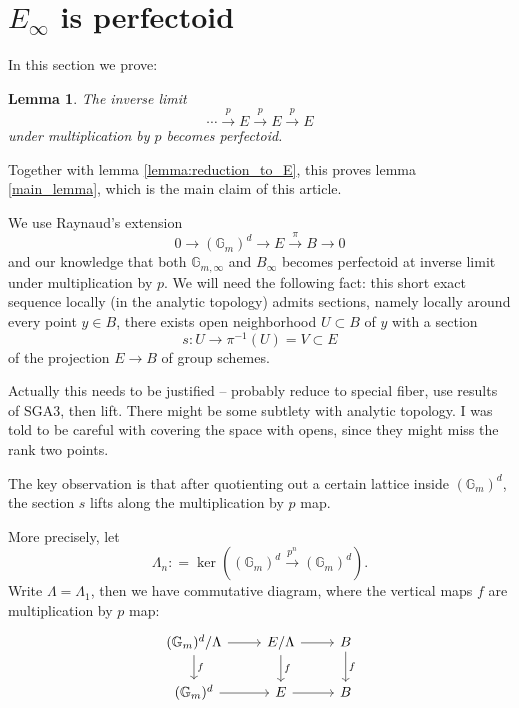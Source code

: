 \documentclass[11pt,oneside]{amsart}
\theoremstyle{theorem}
\newtheorem{lemma}[theorem]{Lemma}
\theoremstyle{definition}
\theoremstyle{remark}
\begin{document}
\section{$E_\infty$ is perfectoid}

In this section we prove: 

\begin{lemma} \label{lemma:E_is_perfectoid}
The inverse limit
$$ \cdots  \xrightarrow{p} E   \xrightarrow{p} E   \xrightarrow{p} E  $$
under multiplication by $p$ becomes perfectoid.  
\end{lemma}

Together with lemma \ref{lemma:reduction_to_E}, this proves lemma \ref{main_lemma}, which is the main claim of this article. 

We use Raynaud's extension 
$$ 0 \rightarrow (\mathbb G_m)^d \rightarrow E \xrightarrow{\pi} B \rightarrow 0 $$ and our knowledge that both $\mathbb G_{m, \infty}$ and $B_\infty$ becomes perfectoid at inverse limit under multiplication by $p$. We will need the following fact: this short exact sequence locally (in the analytic topology) admits sections, namely locally around every point $y \in B$, there exists open neighborhood  $U \subset B$ of $y$ with a section
$$s: U \rightarrow \pi^{-1} (U) = V \subset E$$ of the projection $E \rightarrow B$ of group schemes. 

{\color{red} Actually this needs to be justified -- probably reduce to special fiber, use results of SGA3, then lift. There might be some subtlety with analytic topology. I was told to be careful with covering the space with opens, since they might miss the rank two points. }

The key observation is that after quotienting out a certain lattice inside $(\mathbb G_m)^d$, the section $s$ lifts along the multiplication by $p$ map. 

More precisely, let 
$$\Lambda_n : = \ker ((\mathbb G_m)^d \xrightarrow{p^n} (\mathbb G_m)^d).$$ 
Write $\Lambda = \Lambda_1$,
then we have commutative diagram, where the vertical maps $f$ are multiplication by $p$ map: 
\[
\begin{tikzcd}
(\mathbb G_m)^d/\Lambda \arrow{r}{} \arrow{d}{f} & E/\Lambda \arrow{r}{}  \arrow{d}{f } & B  \arrow{d}{f} \\ 
(\mathbb G_m)^d  \arrow{r}{} & E \arrow{r}{} & B 
\end{tikzcd}
\]
\end{document}
